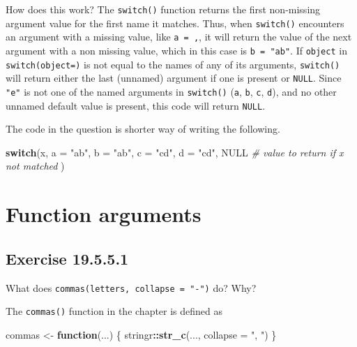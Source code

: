 \documentclass[]{book}
\newenvironment{Shaded}{\begin{snugshade}}{\end{snugshade}}
\newcommand{\CommentTok}[1]{\textcolor[rgb]{0.56,0.35,0.01}{\textit{#1}}}
\newcommand{\ControlFlowTok}[1]{\textcolor[rgb]{0.13,0.29,0.53}{\textbf{#1}}}
\newcommand{\DataTypeTok}[1]{\textcolor[rgb]{0.13,0.29,0.53}{#1}}
\newcommand{\KeywordTok}[1]{\textcolor[rgb]{0.13,0.29,0.53}{\textbf{#1}}}
\newcommand{\NormalTok}[1]{#1}
\newcommand{\OperatorTok}[1]{\textcolor[rgb]{0.81,0.36,0.00}{\textbf{#1}}}
\newcommand{\OtherTok}[1]{\textcolor[rgb]{0.56,0.35,0.01}{#1}}
\newcommand{\StringTok}[1]{\textcolor[rgb]{0.31,0.60,0.02}{#1}}
\theoremstyle{plain}
\theoremstyle{remark}
\begin{document}
How does this work?
The \texttt{switch()} function returns the first non-missing argument value for the first name it matches.
Thus, when \texttt{switch()} encounters an argument with a missing value, like \texttt{a\ =\ ,},
it will return the value of the next argument with a non missing value, which in this case is \texttt{b\ =\ "ab"}.
If \texttt{object} in \texttt{switch(object=)} is not equal to the names of any of its arguments,
\texttt{switch()} will return either the last (unnamed) argument if one is present or \texttt{NULL}.
Since \texttt{"e"} is not one of the named arguments in \texttt{switch()} (\texttt{a}, \texttt{b}, \texttt{c}, \texttt{d}),
and no other unnamed default value is present, this code will return \texttt{NULL}.

The code in the question is shorter way of writing the following.

\begin{Shaded}
\begin{Highlighting}[]
\ControlFlowTok{switch}\NormalTok{(x,}
  \DataTypeTok{a =} \StringTok{"ab"}\NormalTok{,}
  \DataTypeTok{b =} \StringTok{"ab"}\NormalTok{,}
  \DataTypeTok{c =} \StringTok{"cd"}\NormalTok{,}
  \DataTypeTok{d =} \StringTok{"cd"}\NormalTok{,}
  \OtherTok{NULL}  \CommentTok{# value to return if x not matched}
\NormalTok{)}
\end{Highlighting}
\end{Shaded}

\hypertarget{function-arguments}{%
\section{Function arguments}\label{function-arguments}}

\hypertarget{exercise-19.5.5.1}{%
\subsection*{\texorpdfstring{Exercise {19.5.5.1}}{Exercise 19.5.5.1}}\label{exercise-19.5.5.1}}

What does \texttt{commas(letters,\ collapse\ =\ "-")} do? Why?

The \texttt{commas()} function in the chapter is defined as

\begin{Shaded}
\begin{Highlighting}[]
\NormalTok{commas <-}\StringTok{ }\ControlFlowTok{function}\NormalTok{(...) \{}
\NormalTok{  stringr}\OperatorTok{::}\KeywordTok{str_c}\NormalTok{(..., }\DataTypeTok{collapse =} \StringTok{", "}\NormalTok{)}
\NormalTok{\}}
\end{Highlighting}
\end{Shaded}
\end{document}
